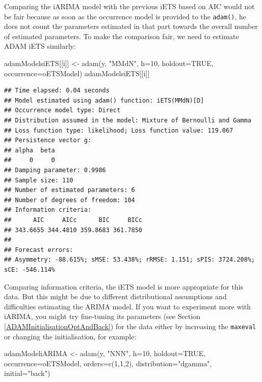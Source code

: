 \documentclass[
]{book}
\newenvironment{Shaded}{\begin{snugshade}}{\end{snugshade}}
\newcommand{\AttributeTok}[1]{\textcolor[rgb]{0.77,0.63,0.00}{#1}}
\newcommand{\ConstantTok}[1]{\textcolor[rgb]{0.00,0.00,0.00}{#1}}
\newcommand{\DecValTok}[1]{\textcolor[rgb]{0.00,0.00,0.81}{#1}}
\newcommand{\FunctionTok}[1]{\textcolor[rgb]{0.00,0.00,0.00}{#1}}
\newcommand{\NormalTok}[1]{#1}
\newcommand{\OtherTok}[1]{\textcolor[rgb]{0.56,0.35,0.01}{#1}}
\newcommand{\StringTok}[1]{\textcolor[rgb]{0.31,0.60,0.02}{#1}}
\theoremstyle{definition}
\theoremstyle{definition}
\theoremstyle{definition}
\theoremstyle{definition}
\theoremstyle{remark}
\begin{document}
Comparing the iARIMA model with the previous iETS based on AIC would not be fair because as soon as the occurrence model is provided to the \texttt{adam()}, he does not count the parameters estimated in that part towards the overall number of estimated parameters. To make the comparison fair, we need to estimate ADAM iETS similarly:

\begin{Shaded}
\begin{Highlighting}[]
\NormalTok{adamModelsiETS[[i]] }\OtherTok{\textless{}{-}} \FunctionTok{adam}\NormalTok{(y, }\StringTok{"MMdN"}\NormalTok{, }\AttributeTok{h=}\DecValTok{10}\NormalTok{, }\AttributeTok{holdout=}\ConstantTok{TRUE}\NormalTok{,}
                            \AttributeTok{occurrence=}\NormalTok{oETSModel)}
\NormalTok{adamModelsiETS[[i]]}
\end{Highlighting}
\end{Shaded}

\begin{verbatim}
## Time elapsed: 0.04 seconds
## Model estimated using adam() function: iETS(MMdN)[D]
## Occurrence model type: Direct
## Distribution assumed in the model: Mixture of Bernoulli and Gamma
## Loss function type: likelihood; Loss function value: 119.067
## Persistence vector g:
## alpha  beta 
##     0     0 
## Damping parameter: 0.9986
## Sample size: 110
## Number of estimated parameters: 6
## Number of degrees of freedom: 104
## Information criteria:
##      AIC     AICc      BIC     BICc 
## 343.6655 344.4810 359.8683 361.7850 
## 
## Forecast errors:
## Asymmetry: -88.615%; sMSE: 53.438%; rRMSE: 1.151; sPIS: 3724.208%; sCE: -546.114%
\end{verbatim}

Comparing information criteria, the iETS model is more appropriate for this data. But this might be due to different distributional assumptions and difficulties estimating the ARIMA model. If you want to experiment more with iARIMA, you might try fine-tuning its parameters (see Section \ref{ADAMInitialisationOptAndBack}) for the data either by increasing the \texttt{maxeval} or changing the initialisation, for example:

\begin{Shaded}
\begin{Highlighting}[]
\NormalTok{adamModeliARIMA }\OtherTok{\textless{}{-}} \FunctionTok{adam}\NormalTok{(y, }\StringTok{"NNN"}\NormalTok{, }\AttributeTok{h=}\DecValTok{10}\NormalTok{, }\AttributeTok{holdout=}\ConstantTok{TRUE}\NormalTok{,}
                        \AttributeTok{occurrence=}\NormalTok{oETSModel, }\AttributeTok{orders=}\FunctionTok{c}\NormalTok{(}\DecValTok{1}\NormalTok{,}\DecValTok{1}\NormalTok{,}\DecValTok{2}\NormalTok{),}
                        \AttributeTok{distribution=}\StringTok{"dgamma"}\NormalTok{, }\AttributeTok{initial=}\StringTok{"back"}\NormalTok{)}
\end{Highlighting}
\end{Shaded}
\end{document}
